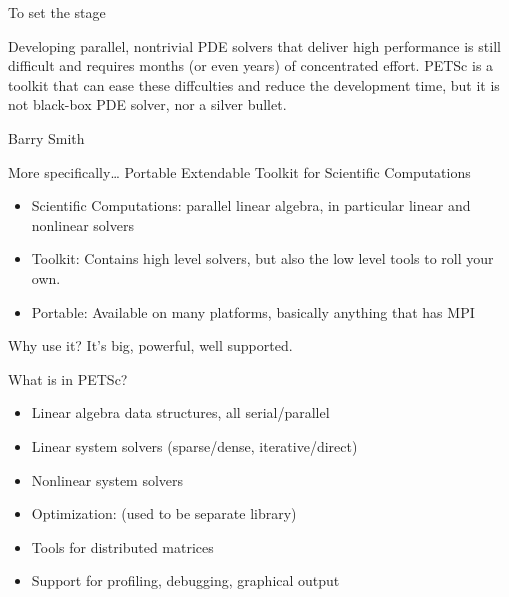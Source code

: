 
\begin{numberedframe}{To set the stage}

  Developing parallel, nontrivial PDE solvers that
  deliver high performance is still difficult and requires months (or
  even years) of concentrated effort.  PETSc is a toolkit that can
  ease these diffculties and reduce the development time, but it is not
  black-box PDE solver, nor a silver bullet.

  Barry Smith
\end{numberedframe}

\begin{numberedframe}{More specifically\ldots}
Portable Extendable Toolkit for Scientific Computations
\begin{itemize}
\item Scientific Computations: parallel linear algebra, in particular
  linear and nonlinear solvers
\item Toolkit: Contains high level solvers, but also the low level tools
  to roll your own.
\item Portable: Available on many platforms, basically anything that has MPI
\end{itemize}

Why use it? It's big, powerful, well supported.
\end{numberedframe}

\begin{numberedframe}{What is in PETSc?}
  \begin{itemize}
  \item Linear algebra data structures, all serial/parallel
  \item Linear system solvers (sparse/dense, iterative/direct)
  \item Nonlinear system solvers
  \item Optimization:  (used to be separate library)
  \item Tools for distributed matrices
  \item Support for profiling, debugging, graphical output
  \end{itemize}
\end{numberedframe}

